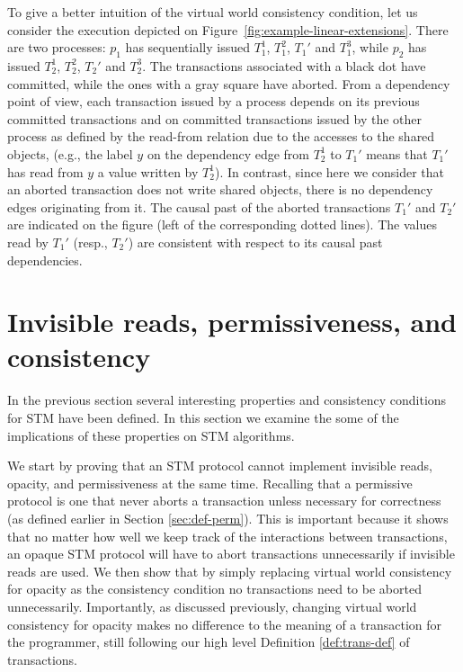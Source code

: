 To give a better  intuition of the virtual world  consistency condition,
let us consider 
the execution depicted on Figure~\ref{fig:example-linear-extensions}. There 
are two processes: $p_1$ has sequentially issued $T_1^1$,  $T_1^2$,  $T_1'$
and $T_1^3$, while $p_2$ has issued   $T_2^1$,  $T_2^2$,  $T_2'$ and
$T_2^3$.  The transactions associated with a black dot have committed, while
the ones with a gray square have aborted. From a dependency point of view, 
each   transaction   issued  by   a   process  depends   on   its  previous
committed   transactions  and    on  committed  transactions   issued by
the  other  process as  defined  by the  read-from relation due to the  
accesses to the shared  objects, (e.g., the label $y$ on the dependency edge 
from  $T_2^1$  to  $T_1'$ means  that   $T_1'$ has  read from $y$ a  value 
written by  $T_2^1$). In contrast, since here we consider that an  aborted  
transaction does not write shared objects, there is no dependency edges 
originating from it. The causal past of the aborted transactions   $T_1'$
and   $T_2'$ are indicated on the figure  (left of the corresponding dotted
lines).   The values read by  $T_1'$ (resp.,  $T_2'$)
are consistent with respect to its causal past dependencies.



\section{Invisible reads, permissiveness, and consistency}
In the previous section several interesting properties and consistency conditions
for STM have been defined.
In this section we examine the some of the implications of these properties
on STM algorithms.

We start by proving that an STM protocol cannot implement invisible reads, opacity,
and permissiveness at the same time.
Recalling that a permissive protocol is one that
never aborts a 
transaction unless necessary for  correctness (as defined earlier in Section \ref{sec:def-perm}).
This is important because it shows that no matter how well we keep track of
the interactions between transactions, an opaque STM protocol will have to abort
transactions unnecessarily if invisible reads are used.
We then show that by simply replacing virtual world consistency for opacity
as the consistency condition no transactions need to be aborted unnecessarily.
Importantly, as discussed previously, changing virtual world consistency for opacity makes no difference
to the meaning of a transaction for the programmer, still following
our high level Definition \ref{def:trans-def} of transactions.

